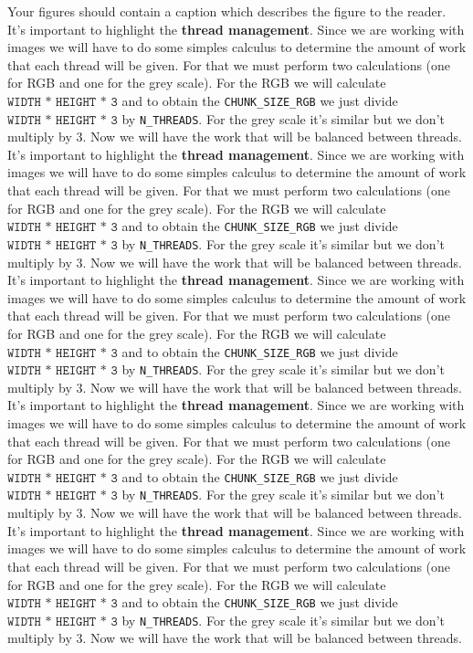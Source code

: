 \documentclass[sigconf]{acmart}
\begin{document}
Your figures should contain a caption which describes the figure to
the reader.
 It's important to highlight the \textbf{thread management}. Since we are working with images we will have to do some simples calculus to determine the amount of work that
 each thread will be given. For that we must perform two calculations (one for RGB and one for the grey scale). For the RGB  we will calculate $\texttt{WIDTH * HEIGHT * 3}$ and to obtain the \texttt{CHUNK\_SIZE\_RGB} we just divide $\texttt{WIDTH * HEIGHT * 3}$  by \texttt{N\_THREADS}. For the grey scale it's similar but we don't multiply by 3. Now we will have the work that will be balanced between threads.
  It's important to highlight the \textbf{thread management}. Since we are working with images we will have to do some simples calculus to determine the amount of work that
 each thread will be given. For that we must perform two calculations (one for RGB and one for the grey scale). For the RGB  we will calculate $\texttt{WIDTH * HEIGHT * 3}$ and to obtain the \texttt{CHUNK\_SIZE\_RGB} we just divide $\texttt{WIDTH * HEIGHT * 3}$  by \texttt{N\_THREADS}. For the grey scale it's similar but we don't multiply by 3. Now we will have the work that will be balanced between threads.
  It's important to highlight the \textbf{thread management}. Since we are working with images we will have to do some simples calculus to determine the amount of work that
 each thread will be given. For that we must perform two calculations (one for RGB and one for the grey scale). For the RGB  we will calculate $\texttt{WIDTH * HEIGHT * 3}$ and to obtain the \texttt{CHUNK\_SIZE\_RGB} we just divide $\texttt{WIDTH * HEIGHT * 3}$  by \texttt{N\_THREADS}. For the grey scale it's similar but we don't multiply by 3. Now we will have the work that will be balanced between threads.
  It's important to highlight the \textbf{thread management}. Since we are working with images we will have to do some simples calculus to determine the amount of work that
 each thread will be given. For that we must perform two calculations (one for RGB and one for the grey scale). For the RGB  we will calculate $\texttt{WIDTH * HEIGHT * 3}$ and to obtain the \texttt{CHUNK\_SIZE\_RGB} we just divide $\texttt{WIDTH * HEIGHT * 3}$  by \texttt{N\_THREADS}. For the grey scale it's similar but we don't multiply by 3. Now we will have the work that will be balanced between threads.
  It's important to highlight the \textbf{thread management}. Since we are working with images we will have to do some simples calculus to determine the amount of work that
 each thread will be given. For that we must perform two calculations (one for RGB and one for the grey scale). For the RGB  we will calculate $\texttt{WIDTH * HEIGHT * 3}$ and to obtain the \texttt{CHUNK\_SIZE\_RGB} we just divide $\texttt{WIDTH * HEIGHT * 3}$  by \texttt{N\_THREADS}. For the grey scale it's similar but we don't multiply by 3. Now we will have the work that will be balanced between threads.
\end{document}
